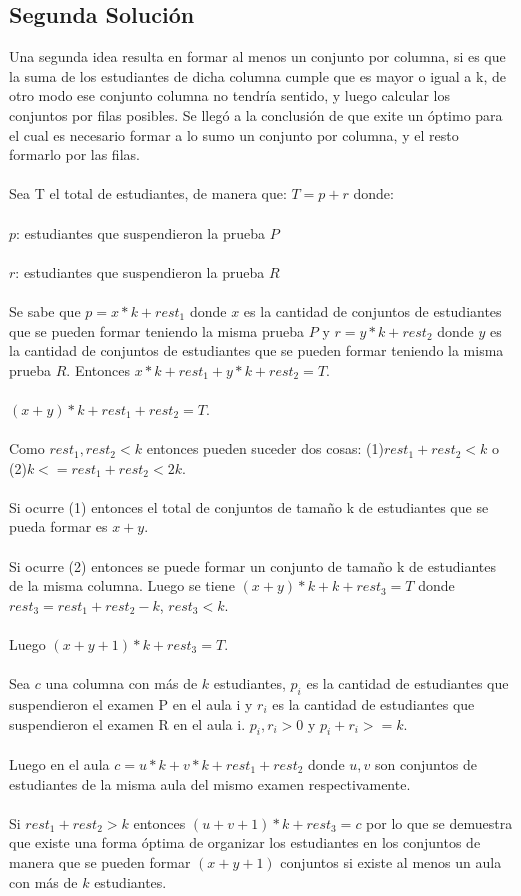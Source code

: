 \documentclass{article}
\begin{document}
\subsection{Segunda Solución}

Una segunda idea resulta en formar al menos un conjunto por columna, si es que la suma de los estudiantes de dicha columna cumple que es mayor o igual a k, de otro modo ese conjunto columna no tendría sentido, y luego calcular los conjuntos por filas posibles. Se llegó a la conclusión de que exite un óptimo para el cual es necesario formar a lo sumo un conjunto por columna, y el resto formarlo por las filas. 
\\
\\
Sea T el total de estudiantes, de manera que: $T = p + r$ donde:
\\
\\
$p$: estudiantes que suspendieron la prueba $P$
\\
\\
$r$: estudiantes que suspendieron la prueba $R$
\\
\\
Se sabe que $ p = x*k + rest_1$ donde $x$ es la cantidad de conjuntos de estudiantes que se pueden formar teniendo la misma prueba $P$ y $ r = y*k + rest_2$ donde $y$ es la cantidad de conjuntos de estudiantes que se pueden formar teniendo la misma prueba $R$. Entonces $x*k + rest_1 + y*k + rest_2 = T$. 
\\
\\
$(x+y)*k + rest_1 + rest_2 = T$.
\\
\\
Como $rest_1, rest_2 < k$ entonces pueden suceder dos cosas:
(1)$rest_1 + rest_2 < k$ o (2)$k <= rest_1 + rest_2 < 2k$.
\\
\\
Si ocurre (1) entonces el total de conjuntos de tamaño k de estudiantes que se pueda formar es $x+y$. 
\\
\\
Si ocurre (2) entonces se puede formar un conjunto de tamaño k de estudiantes de la misma columna. Luego se tiene $(x+y)*k + k + rest_3 = T$ donde $rest_3 = rest_1 + rest_2 - k$, $rest_3 <k$. 
\\
\\
Luego  $(x+y+1)*k + rest_3 = T$.
\\
\\
Sea $c$ una columna con más de $k$ estudiantes, $p_i$ es la cantidad de estudiantes que suspendieron el examen P en el aula i
y $r_i$ es la cantidad de estudiantes que suspendieron el examen R en el aula i. $p_i, r_i > 0$ y $p_i + r_i >= k$. 
\\
\\
Luego en el aula $c = u*k + v*k + rest_1 + rest_2$ donde $u,v$ son conjuntos de estudiantes de la misma aula del mismo examen respectivamente. 
\\
\\
Si $ rest_1 + rest_2 > k $ entonces $ (u + v + 1)*k + rest_3 = c $ por lo que se demuestra que existe una forma óptima de organizar los estudiantes en los conjuntos de manera que se pueden formar $(x+y+1)$ conjuntos si existe al menos un aula con más de $k$ estudiantes.
\end{document}
